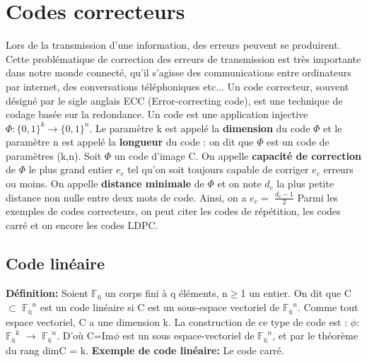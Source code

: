 \documentclass[french,nochapter,11pt]{rapportUB}
\begin{document}
\section{Codes correcteurs}
Lors de la transmission d'une information, des erreurs peuvent se produirent. Cette problématique de correction des erreurs de transmission est 
très importante dans notre monde connecté, qu'il s'agisse des communications entre ordinateurs par internet, des conversations téléphoniques etc...\newline
Un code correcteur, souvent désigné par le sigle anglais ECC (Error-correcting code), est une technique de codage basée sur la redondance.
Un code est une application injective $\Phi:\{0,1\}^k \rightarrow \{0,1\}^n $.\newline
Le paramètre k est appelé la \textbf{dimension} du code $\Phi$ et le paramètre n est appelé la \textbf{longueur} du code : on dit que $\Phi$ est un 
code de paramètres (k,n).\vspace{0.4cm}\newline
Soit $\Phi$ un code d'image C.\newline
On appelle \textbf{capacité de correction} de $\Phi$ le plus grand entier $e_c$ tel qu'on soit toujours capable de corriger $e_c$ erreurs ou moins. \newline
On appelle \textbf{distance minimale} de $\Phi$ et on note $d_c$ la plus petite distance non nulle entre deux mots de code. \newline
Ainsi, on a \textbf{$e_c = $} $\frac{d_c-1}{2}$\vspace{0.4cm}\newline
Parmi les exemples de codes correcteurs, on peut citer les codes de répétition, les codes carré et on encore les codes LDPC.
\subsection{Code linéaire}
\textbf{Définition:} Soient $\mathbb{F_q}$ un corps fini à q éléments, n$\geq$1 un entier. On dit que C $\subset$ $\mathbb{F_q}^n$ est un code linéaire si C est un sous-espace vectoriel de $\mathbb{F_q}^n$. Comme tout espace vectoriel, C a une dimension k. \newline
La construction de ce type de code est : $\phi$: $\mathbb{F_q}^k$ $\to$ $\mathbb{F_q}^n$. D'où C=Im$\phi$ est un sous espace-vectoriel de $\mathbb{F_q}^n$, et par le théorème du rang dimC = k. \newline
\textbf{Exemple de code linéaire:} Le code carré. 
\end{document}
